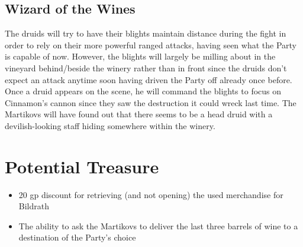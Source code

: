 \documentclass[a4paper,11pt]{article}
\begin{document}
\subsection{Wizard of the Wines}
The druids will try to have their blights maintain distance during the fight in order to rely on their more 
powerful ranged attacks, having seen what the Party is capable of now. However, the blights will largely be 
milling about in the vineyard behind/beside the winery rather than in front since the druids don't expect an 
attack anytime soon having driven the Party off already once before. Once a druid appears on the scene, he will 
command the blights to focus on Cinnamon's cannon since they saw the destruction it could wreck last time. The 
Martikovs will have found out that there seems to be a head druid with a devilish-looking staff hiding somewhere
within the winery.

\section{Potential Treasure}
\label{sec:PotentialTreasure}
\begin{itemize}
  \item 20 gp discount for retrieving (and not opening) the used merchandise for Bildrath
  \item The ability to ask the Martikovs to deliver the last three barrels of wine to a destination of the 
  Party's choice
\end{itemize}
\end{document}
